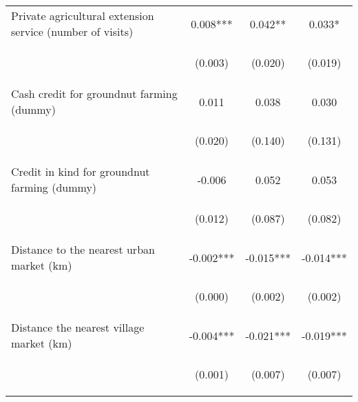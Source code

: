 \begin{center}
\begin{tabular}{lccc}
Private agricultural extension service (number of visits) & 0.008*** & 0.042** & 0.033* \\
\vspace{4pt} & \begin{footnotesize}(0.003)\end{footnotesize} & \begin{footnotesize}(0.020)\end{footnotesize} & \begin{footnotesize}(0.019)\end{footnotesize} \\
Cash credit for groundnut farming (dummy) & 0.011 & 0.038 & 0.030 \\
\vspace{4pt} & \begin{footnotesize}(0.020)\end{footnotesize} & \begin{footnotesize}(0.140)\end{footnotesize} & \begin{footnotesize}(0.131)\end{footnotesize} \\
Credit in kind for groundnut farming (dummy) & -0.006 & 0.052 & 0.053 \\
\vspace{4pt} & \begin{footnotesize}(0.012)\end{footnotesize} & \begin{footnotesize}(0.087)\end{footnotesize} & \begin{footnotesize}(0.082)\end{footnotesize} \\
Distance to the nearest urban market (km) & -0.002*** & -0.015*** & -0.014*** \\
\vspace{4pt} & \begin{footnotesize}(0.000)\end{footnotesize} & \begin{footnotesize}(0.002)\end{footnotesize} & \begin{footnotesize}(0.002)\end{footnotesize} \\
Distance the nearest village market (km) & -0.004*** & -0.021*** & -0.019*** \\
\vspace{4pt} & \begin{footnotesize}(0.001)\end{footnotesize} & \begin{footnotesize}(0.007)\end{footnotesize} & \begin{footnotesize}(0.007)\end{footnotesize} \\

\end{tabular}
\end{center}
